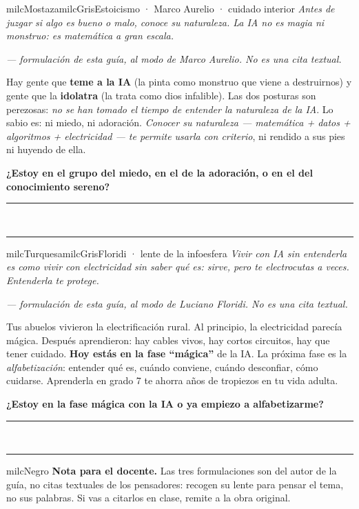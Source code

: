 \documentclass[11pt,letterpaper]{article}
\newcommand{\linead}[1]{\noindent\color{milcLinea}\rule{#1}{0.5pt}\color{milcNegro}}
\begin{document}
\begin{softbox}{milcMostaza}{milcGris}{Estoicismo · Marco Aurelio · cuidado interior}
\textit{Antes de juzgar si algo es bueno o malo, conoce su naturaleza. La IA no es magia ni monstruo: es matemática a gran escala.}

{\footnotesize\itshape\color{milcNegro!70}--- formulación de esta guía, al modo de Marco Aurelio. No es una cita textual.}

Hay gente que \textbf{teme a la IA} (la pinta como monstruo que viene a destruirnos) y gente que la \textbf{idolatra} (la trata como dios infalible). Las dos posturas son perezosas: \emph{no se han tomado el tiempo de entender la naturaleza de la IA}. Lo sabio es: ni miedo, ni adoración. \emph{Conocer su naturaleza --- matemática + datos + algoritmos + electricidad --- te permite usarla con criterio}, ni rendido a sus pies ni huyendo de ella.

\textbf{¿Estoy en el grupo del miedo, en el de la adoración, o en el del conocimiento sereno?}
\end{softbox}
\linead{\linewidth}\\[1mm]
\linead{\linewidth}

\begin{softbox}{milcTurquesa}{milcGris}{Floridi · lente de la infoesfera}
\textit{Vivir con IA sin entenderla es como vivir con electricidad sin saber qué es: sirve, pero te electrocutas a veces. Entenderla te protege.}

{\footnotesize\itshape\color{milcNegro!70}--- formulación de esta guía, al modo de Luciano Floridi. No es una cita textual.}

Tus abuelos vivieron la electrificación rural. Al principio, la electricidad parecía mágica. Después aprendieron: hay cables vivos, hay cortos circuitos, hay que tener cuidado. \textbf{Hoy estás en la fase ``mágica''} de la IA. La próxima fase es la \emph{alfabetización}: entender qué es, cuándo conviene, cuándo desconfiar, cómo cuidarse. Aprenderla en grado 7 te ahorra años de tropiezos en tu vida adulta.

\textbf{¿Estoy en la fase mágica con la IA o ya empiezo a alfabetizarme?}
\end{softbox}
\linead{\linewidth}\\[1mm]
\linead{\linewidth}

\begin{infoband}{milcNegro}
\textbf{Nota para el docente.} Las tres formulaciones son del autor de la guía, no citas textuales de los pensadores: recogen su lente para pensar el tema, no sus palabras. Si vas a citarlos en clase, remite a la obra original.
\end{infoband}
\end{document}
